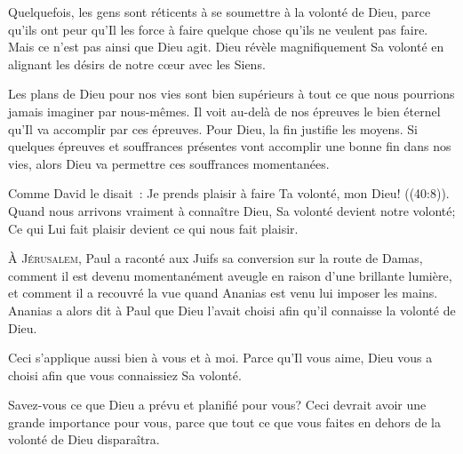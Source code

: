 
Quelquefois, les gens sont réticents à se soumettre à la volonté de Dieu,
 parce qu'ils ont peur qu'Il les force à faire quelque chose
 qu'ils ne veulent pas faire. Mais ce n'est pas ainsi que Dieu agit.
 Dieu révèle magnifiquement Sa volonté en alignant les désirs de notre
 c\oe{}ur avec les Siens.

Les plans de Dieu pour nos vies sont bien supérieurs à tout
 ce que nous pourrions jamais imaginer par nous-mêmes.
 Il voit au-delà de nos épreuves le bien éternel qu'Il va accomplir
 par ces épreuves. Pour Dieu, la fin justifie les moyens.
 Si quelques épreuves et souffrances présentes vont accomplir
 une bonne fin dans nos vies, alors Dieu va permettre
 ces souffrances momentanées.

Comme David le disait~: 
 \Og Je prends plaisir à faire Ta volonté, mon Dieu! \Fg{}
 ((40:8)). Quand nous arrivons vraiment à connaître Dieu,
 Sa volonté devient notre volonté; Ce qui Lui fait plaisir
 devient ce qui nous fait plaisir.

\dvrule






\lettrine{À}{ Jérusalem}, Paul a raconté aux Juifs sa conversion
 sur la route de Damas, comment il est devenu momentanément aveugle
 en raison d'une brillante lumière, et comment il a recouvré la vue
 quand Ananias est venu lui imposer les mains.
 Ananias a alors dit à Paul que Dieu l'avait choisi afin qu'il connaisse
 la volonté de Dieu.

Ceci s'applique aussi bien à vous et à moi.
 Parce qu'Il vous aime, Dieu vous a choisi afin que vous connaissiez Sa volonté.

Savez-vous ce que Dieu a prévu et planifié pour vous?
 Ceci devrait avoir une grande importance pour vous,
 parce que tout ce que vous faites en dehors de la volonté de Dieu disparaîtra.

